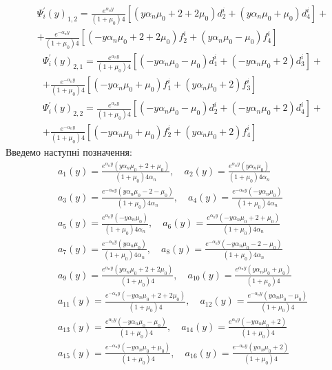 \begin{align*}
    &\Psi_i^{'}(y)_{1,2}=  \frac{e^{\alpha_n y}}{(1 + \mu_0) 4} \left[ (y \alpha_n \mu_0 + 2 + 2 \mu_0)d_2^i + (y \alpha_n \mu_0 + \mu_0)d_4^i \right] + \\ 
    &+ \frac{e^{-\alpha_n y}}{(1 + \mu_0) 4} \left[ (-y \alpha_n \mu_0 + 2 + 2 \mu_0) f_2^i + (y \alpha_n \mu_0 - \mu_0) f_4^i \right]
\end{align*}
\begin{align*}
    &\Psi_i^{'}(y)_{2,1}=  \frac{e^{\alpha_n y}}{(1 + \mu_0) 4} \left[ (-y \alpha_n \mu_0 - \mu_0) d_1^i + (-y \alpha_n \mu_0 + 2) d_3^i \right] + \\ 
    &+ \frac{e^{-\alpha_n y}}{(1 + \mu_0) 4} \left[ (-y \alpha_n \mu_0 + \mu_0) f_1^i + (y \alpha_n \mu_0 + 2) f_3^i \right]
\end{align*}
\begin{align*}
    &\Psi_i^{'}(y)_{2,2}=  \frac{e^{\alpha_n y}}{(1 + \mu_0) 4} \left[ (-y \alpha_n \mu_0 - \mu_0) d_2^i + (-y \alpha_n \mu_0 + 2) d_4^i \right] + \\ 
    &+ \frac{e^{-\alpha_n y}}{(1 + \mu_0) 4} \left[ (-y \alpha_n \mu_0 + \mu_0) f_2^i + (y \alpha_n \mu_0 + 2) f_4^i \right]
\end{align*}
Введемо наступні позначення:
\begin{align*}\tag{Ап.C. 4}\label{ap_c_def_static}
    &a_1(y) = \frac{e^{\alpha_n y} (y \alpha_n \mu_0 + 2 + \mu_0)}{(1 + \mu_0) 4 \alpha_n}, \quad a_2(y) = \frac{e^{\alpha_n y} (y \alpha_n \mu_0)}{(1 + \mu_0) 4 \alpha_n} \\
    &a_3(y) = \frac{e^{-\alpha_n y} (y \alpha_n \mu_0 - 2 - \mu_0)}{(1 + \mu_0) 4 \alpha_n}, \quad a_4(y) =  \frac{e^{-\alpha_n y} (-y \alpha_n \mu_0)}{(1 + \mu_0) 4 \alpha_n} \\
    &a_5(y) = \frac{e^{\alpha_n y} (-y \alpha_n \mu_0)}{(1 + \mu_0) 4 \alpha_n}, \quad a_6(y) = \frac{e^{\alpha_n y} (-y \alpha_n \mu_0 + 2 + \mu_0)}{(1 + \mu_0) 4 \alpha_n} \\
    &a_7(y) = \frac{e^{-\alpha_n y} (y \alpha_n \mu_0)}{(1 + \mu_0) 4 \alpha_n}, \quad a_8(y) = \frac{e^{-\alpha_n y}  (-y \alpha_n \mu_0 - 2 - \mu_0)}{(1 + \mu_0) 4 \alpha_n} \\
    &a_9(y) = \frac{e^{\alpha_n y} (y \alpha_n \mu_0 + 2 + 2 \mu_0)}{(1 + \mu_0) 4}, \quad a_{10}(y) = \frac{e^{\alpha_n y} (y \alpha_n \mu_0 + \mu_0)}{(1 + \mu_0) 4} \\
    &a_{11}(y) = \frac{e^{-\alpha_n y} (-y \alpha_n \mu_0 + 2 + 2 \mu_0)}{(1 + \mu_0) 4}, \quad a_{12}(y) = \frac{e^{-\alpha_n y} (y \alpha_n \mu_0 - \mu_0)}{(1 + \mu_0) 4} \\
    &a_{13}(y) = \frac{e^{\alpha_n y} (-y \alpha_n \mu_0 - \mu_0)}{(1 + \mu_0) 4}, \quad a_{14}(y) = \frac{e^{\alpha_n y} (-y \alpha_n \mu_0 + 2)}{(1 + \mu_0) 4} \\
    &a_{15}(y) = \frac{e^{-\alpha_n y} (-y \alpha_n \mu_0 + \mu_0)}{(1 + \mu_0) 4}, \quad a_{16}(y) = \frac{e^{-\alpha_n y} (y \alpha_n \mu_0 + 2)}{(1 + \mu_0) 4}
\end{align*}

